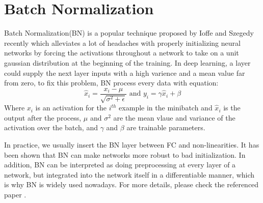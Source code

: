 \section{Batch Normalization}
Batch Normalization(BN) is a popular technique proposed by Ioffe and Szegedy \cite{ioffe2015batch} recently 
which alleviates a lot of headaches with properly initializing neural networks by forcing 
the activations throughout a network 
to take on a unit gaussian distribution at the beginning of the training. 
In deep learning, a layer could supply the next layer inputs with a high varience and a mean value far from zero,
to fix this problem, BN process every data with equation:
$$\hat{x}_{i}=\frac{x_{i}-\mu}{\sqrt{\sigma^{2}+\epsilon}} \text { and } y_{i}=\gamma \hat{x}_{i}+\beta$$
Where $x_{i}$ is an activation for the $i^{th}$ example in the minibatch and $\hat{x}_{i}$ is the output after 
the process, $\mu$ and $\sigma^{2}$ are the mean vlaue and variance of the activation over the batch, and
$\gamma$ and $\beta$ are trainable parameters.

In practice, we usually insert the BN layer between FC and non-linearities.
It has been shown that BN can make networks more robust to bad 
initialization. In addition, BN can be interpreted as doing preprocessing at every layer of a network, but 
integrated into the network itself in a differentiable manner, which is why BN is widely used nowadays.
For more details, please check the referenced paper \cite{ioffe2015batch}.

